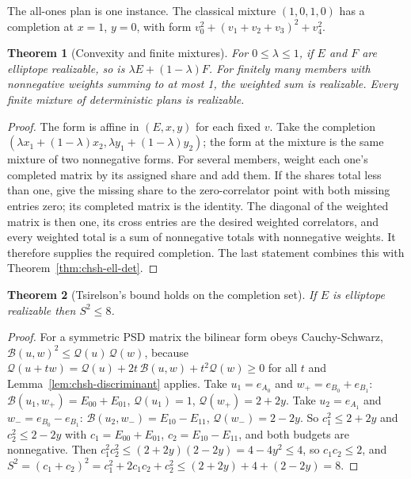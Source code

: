 \documentclass[11pt,twoside]{article}
\theoremstyle{thielethm}
\newtheorem{theorem}{Theorem}[section]
\theoremstyle{thieledef}
\theoremstyle{thieledef}
\theoremstyle{thieledef}
\theoremstyle{thielethm}
\theoremstyle{thieleobs}
\theoremstyle{thielethm}
\begin{document}
The all-ones plan is one instance. The classical mixture $(1,0,1,0)$ has a completion at
$x=1$, $y=0$, with form $v_0^2+(v_1+v_2+v_3)^2+v_4^2$.

\begin{theorem}[Convexity and finite mixtures]\label{thm:chsh-ell-convex}
For $0 \le \lambda \le 1$, if $E$ and $F$ are elliptope realizable, so is
$\lambda E + (1 - \lambda) F$. For finitely
many members with nonnegative weights summing to at most 1, the weighted sum is realizable. Every finite mixture of deterministic plans is realizable.
\end{theorem}

\begin{proof}
The form is affine in $(E, x, y)$ for each fixed $v$. Take the completion
$(\lambda x_1 + (1-\lambda) x_2, \lambda y_1 + (1-\lambda) y_2)$; the form at the mixture is
the same mixture of two nonnegative forms. For several members, weight each one's completed matrix by its assigned
share and add them. If the shares total less than one, give the missing
share to the zero-correlator point with both missing entries zero; its
completed matrix is the identity. The diagonal of the weighted matrix is
then one, its cross entries are the desired weighted correlators, and every
weighted total is a sum of nonnegative totals with nonnegative weights.
It therefore supplies the required completion.
The last statement combines this with Theorem~\ref{thm:chsh-ell-det}.
\end{proof}

\begin{theorem}[Tsirelson's bound holds on the completion set]\label{thm:chsh-ell-tsirelson}
If $E$ is elliptope realizable then $S^2 \le 8$.
\end{theorem}

\begin{proof}
For a symmetric PSD matrix the bilinear form obeys Cauchy-Schwarz,
$\mathcal B(u, w)^2 \le \mathcal Q(u)\, \mathcal Q(w)$, because
$\mathcal Q(u + t w) = \mathcal Q(u) + 2t\,\mathcal B(u,w) + t^2 \mathcal Q(w) \ge 0$ for all
$t$ and Lemma~\ref{lem:chsh-discriminant} applies. Take $u_1 = e_{A_0}$ and
$w_+ = e_{B_0} + e_{B_1}$: $\mathcal B(u_1, w_+) = E_{00} + E_{01}$, $\mathcal Q(u_1) = 1$,
$\mathcal Q(w_+) = 2 + 2y$. Take $u_2 = e_{A_1}$ and $w_- = e_{B_0} - e_{B_1}$:
$\mathcal B(u_2, w_-) = E_{10} - E_{11}$, $\mathcal Q(w_-) = 2 - 2y$. So
$c_1^2 \le 2 + 2y$ and $c_2^2 \le 2 - 2y$ with $c_1 = E_{00} + E_{01}$,
$c_2 = E_{10} - E_{11}$, and both budgets are nonnegative. Then
$c_1^2 c_2^2 \le (2 + 2y)(2 - 2y) = 4 - 4y^2 \le 4$, so $c_1 c_2 \le 2$, and
$S^2 = (c_1 + c_2)^2 = c_1^2 + 2 c_1 c_2 + c_2^2 \le (2 + 2y) + 4 + (2 - 2y) = 8$.
\end{proof}
\end{document}
